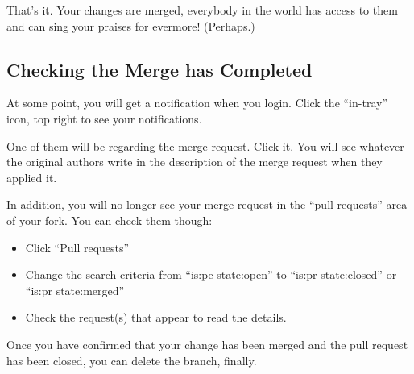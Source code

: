 That's it. Your changes are merged, everybody in the world has access to them and can sing your praises for evermore! (Perhaps.)


\subsection{Checking the Merge has Completed}

At some point, you will get a notification when you login. Click the ``in-tray'' icon, top right to see your notifications.

One of them will be regarding the merge request. Click it. You will see whatever the original authors write in the description of the merge request when they applied it.

In addition, you will no longer see your merge request in the ``pull requests'' area of your fork. You can check them though:

\begin{itemize}
    \item Click ``Pull requests''
    \item Change the search criteria from ``is:pe state:open'' to ``is:pr state:closed'' or ``is:pr state:merged''
    \item Check the request(s) that appear to read the details.
\end{itemize}

Once you have confirmed that your change has been merged and the pull request has been closed, you can delete the branch, finally.


